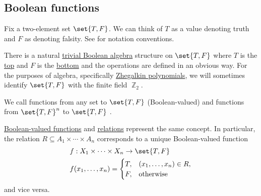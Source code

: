 \subsection{Boolean functions}\label{subsec:boolean_functions}

\begin{definition}\label{def:boolean_value}
  Fix a two-element set \( \set{ T, F } \). We can think of \( T \) as a value denoting truth and \( F \) as denoting falsity. See  for notation conventions.

  There is a natural \hyperref[def:boolean_algebra/trivial]{trivial Boolean algebra} structure on \( \set{ T, F } \) where \( T \) is the \hyperref[def:partially_ordered_set_extremal_points/top_and_bottom]{top} and \( F \) is the \hyperref[def:partially_ordered_set_extremal_points/top_and_bottom]{bottom} and the operations are defined in an obvious way. For the purposes of algebra, specifically \hyperref[def:zhegalkin_polynomial]{Zhegalkin polynomials}, we will sometimes identify \( \set{ T, F } \) with the finite field \hyperref[thm:f2_is_boolean_algebra]{\( \BbbZ_2 \)}.
\end{definition}

\begin{definition}\label{def:boolean_function}
  We call functions from any set to \( \set{ T, F } \) (Boolean-valued)  and functions from \( \set{ T, F }^n \) to \( \set{ T, F } \) .
\end{definition}

\begin{remark}\label{rem:boolean_valued_functions_and_predicates}
  \hyperref[def:boolean_function]{Boolean-valued functions} and \hyperref[def:relation]{relations} represent the same concept. In particular, the relation \( R \subseteq A_1 \times \cdots \times A_n \) corresponds to a unique Boolean-valued function
  \begin{equation*}
    \begin{aligned}
      &f: X_1 \times \cdots \times X_n \to \set{ T, F } \\
      &f(x_1, \ldots, x_n) = \begin{cases}
        T, &(x_1, \ldots, x_n) \in R, \\
        F, &\T{otherwise}
      \end{cases}
    \end{aligned}
  \end{equation*}
  and vice versa.
\end{remark}

